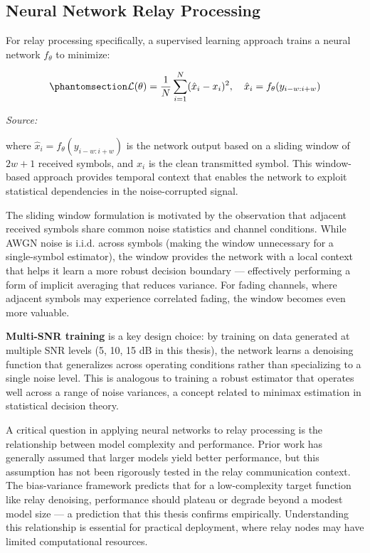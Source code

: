 \subsection{Neural Network Relay Processing}\label{sec:neural-network-relay-processing}

For relay processing specifically, a supervised learning approach trains a neural network \(f_\theta\) to minimize:

\begin{equation}\protect\phantomsection\label{eq:mse-loss}{\mathcal{L}(\theta) = \frac{1}{N} \sum_{i=1}^{N} (\hat{x}_i - x_i)^2, \quad \hat{x}_i = f_\theta(y_{i-w:i+w})
}\end{equation} \par{\small\textit{Source: \cite{goodfellow2016deep}}}

where \(\hat{x}_i = f_\theta(y_{i-w:i+w})\) is the network output based on a sliding window of \(2w+1\) received symbols, and \(x_i\) is the clean transmitted symbol. This window-based approach provides temporal context that enables the network to exploit statistical dependencies in the noise-corrupted signal.

The sliding window formulation is motivated by the observation that adjacent received symbols share common noise statistics and channel conditions. While AWGN noise is i.i.d. across symbols (making the window unnecessary for a single-symbol estimator), the window provides the network with a local context that helps it learn a more robust decision boundary --- effectively performing a form of implicit averaging that reduces variance. For fading channels, where adjacent symbols may experience correlated fading, the window becomes even more valuable.

\textbf{Multi-SNR training} is a key design choice: by training on data generated at multiple SNR levels (5, 10, 15 dB in this thesis), the network learns a denoising function that generalizes across operating conditions rather than specializing to a single noise level. This is analogous to training a robust estimator that operates well across a range of noise variances, a concept related to minimax estimation in statistical decision theory.

A critical question in applying neural networks to relay processing is the relationship between model complexity and performance. Prior work has generally assumed that larger models yield better performance, but this assumption has not been rigorously tested in the relay communication context. The bias-variance framework predicts that for a low-complexity target function like relay denoising, performance should plateau or degrade beyond a modest model size --- a prediction that this thesis confirms empirically. Understanding this relationship is essential for practical deployment, where relay nodes may have limited computational resources.

